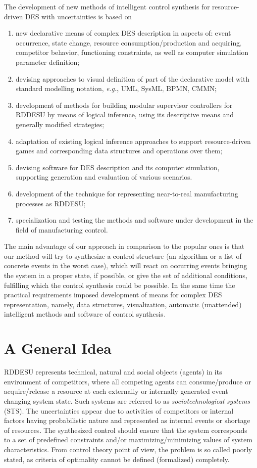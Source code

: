 \documentclass[conference]{IEEEtran}
\begin{document}
The development of new methods of intelligent control synthesis for resource-driven DES with uncertainties is based on
\begin{enumerate}
\item new declarative means of complex DES description in aspects of: event occurrence, state change, resource consumption/production and acquiring, competitor behavior, functioning constraints, as well as computer simulation parameter definition;
\item devising approaches to visual definition of part of the declarative model with standard modelling notation, \emph{e.g.}, UML, SysML, BPMN, CMMN;
\item development of methods for building modular supervisor controllers for RDDESU by means of logical inference, using its descriptive means and generally modified strategies;
\item adaptation of existing logical inference approaches to support resource-driven games and corresponding data structures and operations over them;
\item devising software for DES description and its computer simulation, supporting generation and evaluation of various scenarios.
\item development of the technique for representing near-to-real manufacturing processes as RDDESU;
\item specialization and testing the methods and software under development in the field of manufacturing control.
\end{enumerate}

The main advantage of our approach in comparison to the popular ones is that our method will try to synthesize a control structure (an algorithm or a list of concrete events in the worst case), which will react on occurring events bringing the system in a proper state, if possible, or give the set of additional conditions, fulfilling which the control synthesis could be possible. In the same time the practical requirements imposed development of means for complex DES representation, namely, data structures, visualization, automatic (unattended) intelligent methods and software of control synthesis.

\section{A General Idea}
\label{sec:idea}

RDDESU represents technical, natural and social objects (agents) in its environment of competitors, where all competing agents can consume/produce or acquire/release a resource at each externally or internally generated event changing system state.  Such systems are referred to as \emph{sociotechnological systems} (STS).  The uncertainties appear due to activities of competitors or internal factors having probabilistic nature and represented as internal events or shortage of resources. The synthesized control should ensure that the system corresponds to a set of predefined constraints and/or maximizing/minimizing values of system characteristics.  From control theory point of view, the problem is so called poorly stated, as criteria of optimality cannot be defined (formalized) completely.
\end{document}

